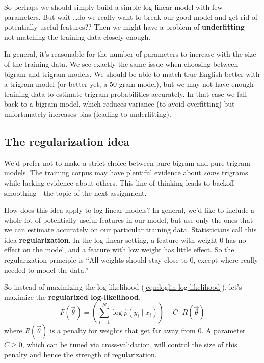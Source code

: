 \documentclass[11pt]{article}
\newcommand{\vtheta}{\vec{\theta}}
\newcommand{\ph}{\hat{p}}
\begin{document}
So perhaps we should simply build a simple log-linear model with few
parameters.  But wait \ldots do we really want to break our good model
and get rid of potentially useful features??  Then we might have a
problem of {\bf underfitting}---not matching the training data closely
enough.

In general, it's reasonable for the number of parameters to increase
with the size of the training data.  We see exactly the same issue
when choosing between bigram and trigram models.  We should be able to
match true English better with a trigram model (or better yet, a
50-gram model), but we may not have enough training data to estimate
trigram probabilities accurately.  In that case we fall back to a
bigram model, which reduces variance (to avoid overfitting) but
unfortunately increases bias (leading to underfitting).

\subsection{The regularization idea}

We'd prefer not to make a strict choice between pure bigram and
pure trigram models.  The training corpus may have plentiful evidence
about {\em some} trigrams while lacking evidence about others.  This
line of thinking leads to backoff smoothing---the topic of the next
assignment.

How does this idea apply to log-linear models?  In general, we'd like
to include a whole lot of potentially useful features in our model,
but use only the ones that we can estimate accurately on our
particular training data.  Statisticians call this idea {\bf
  regularization}.  In the log-linear setting, a feature with weight 0
has no effect on the model, and a feature with low weight has little
effect.  So the regularization principle is ``All weights should stay
close to 0, except where really needed to model the data.''

So instead of maximizing the log-likelihood
(\ref{eqn:loglin-log-likelihood}), let's maximize the
{\bf regularized log-likelihood},
\begin{equation}\label{eqn:loglin-regularized}
  F(\vtheta) = \left( \sum_{i=1}^N \log \ph(y_i \mid x_i) \right) - C\cdot R(\vtheta)
\end{equation}
where $R(\vtheta)$ is a penalty for weights that get far away from 0.
A parameter $C \geq 0$, which can be tuned via cross-validation, will control the size of this penalty and
hence the strength of regularization.
\end{document}
